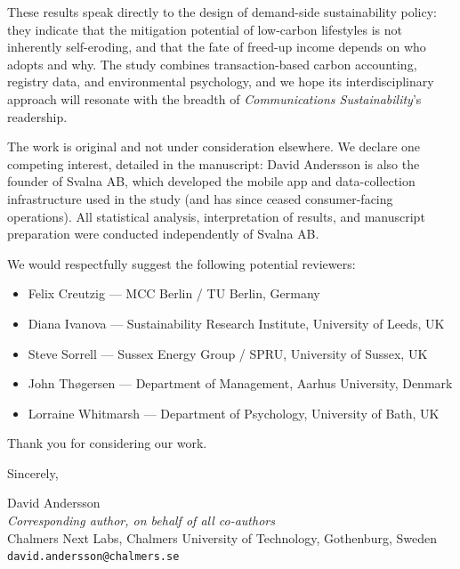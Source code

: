 \documentclass[12pt,a4paper]{article}
\begin{document}
These results speak directly to the design of demand-side sustainability policy: they indicate that the mitigation potential of low-carbon lifestyles is not inherently self-eroding, and that the fate of freed-up income depends on who adopts and why. The study combines transaction-based carbon accounting, registry data, and environmental psychology, and we hope its interdisciplinary approach will resonate with the breadth of \textit{Communications Sustainability}'s readership.

The work is original and not under consideration elsewhere. We declare one competing interest, detailed in the manuscript: David Andersson is also the founder of Svalna AB, which developed the mobile app and data-collection infrastructure used in the study (and has since ceased consumer-facing operations). All statistical analysis, interpretation of results, and manuscript preparation were conducted independently of Svalna AB.

We would respectfully suggest the following potential reviewers:

\begin{itemize}[noitemsep, topsep=0.5em, leftmargin=1.5em]
  \item Felix Creutzig --- MCC Berlin / TU Berlin, Germany
  \item Diana Ivanova --- Sustainability Research Institute,
        University of Leeds, UK
  \item Steve Sorrell --- Sussex Energy Group / SPRU,
        University of Sussex, UK
  \item John Th{\o}gersen --- Department of Management,
        Aarhus University, Denmark
  \item Lorraine Whitmarsh --- Department of Psychology,
        University of Bath, UK
\end{itemize}

Thank you for considering our work.

\bigskip

Sincerely,

David Andersson\\[0.2em]
\textit{Corresponding author, on behalf of all co-authors}\\[0.2em]
Chalmers Next Labs, Chalmers University of Technology, Gothenburg, Sweden\\[0.2em]
\texttt{david.andersson@chalmers.se}
\end{document}
